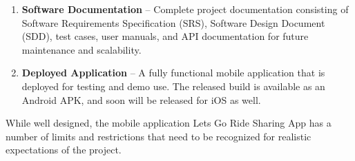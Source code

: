 \begin{enumerate}
    \item \textbf{Software Documentation} – Complete project documentation consisting of Software Requirements Specification (SRS), Software Design Document (SDD), test cases, user manuals, and API documentation for future maintenance and scalability.

    \item \textbf{Deployed Application} – A fully functional mobile application that is deployed for testing and demo use. The released build is available as an Android APK, and soon will be released for iOS as well.
\end{enumerate}


While well designed, the mobile application Lets Go Ride Sharing App has a number of limits and restrictions that need to be recognized for realistic expectations of the project.

